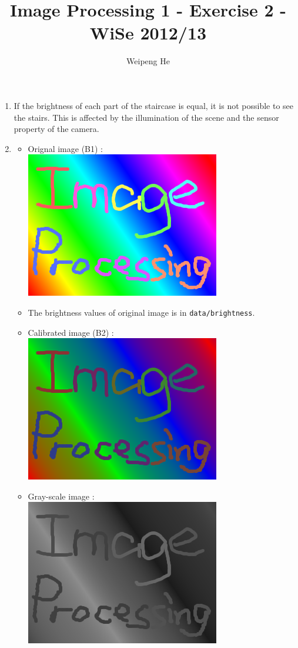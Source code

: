 \documentclass[a4paper,11pt]{article}
\title{Image Processing 1 - Exercise 2 - WiSe 2012/13}
\author{Weipeng He}
\begin{document}
\maketitle

\begin{enumerate}
  \item If the brightness of each part of the staircase is equal, it is not possible to see the stairs. This is affected by the illumination of the scene and the sensor property of the camera.
  
  \item 
  \begin{itemize}
    \item Orignal image (B1) : \\    
    \includegraphics[width=.6\textwidth]{B1}
    
    \item The brightness values of original image is in \texttt{data/brightness}.
    
    \item Calibrated image (B2) : \\
    \includegraphics[width=.6\textwidth]{B2}
    
    \item Gray-scale image : \\    
    \includegraphics[width=.6\textwidth]{B2-grayscale}
      

\end{itemize}
\end{enumerate}
\end{document}
